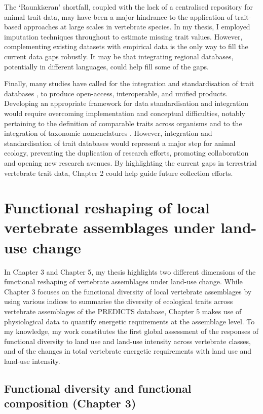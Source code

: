 The `Raunkiæran' shortfall, coupled with the lack of a centralised repository for animal trait data, may have been a major hindrance to the application of trait-based approaches at large scales in vertebrate species. In my thesis, I employed imputation techniques throughout to estimate missing trait values. However, complementing existing datasets with empirical data is the only way to fill the current data gaps robustly. It may be that integrating regional databases, potentially in different languages, could help fill some of the gaps.

Finally, many studies have called for the integration and standardisation of trait databases \citep{Kissling2018, Schneider2019, Weiss2019, Junker2022}, to produce open-access, interoperable, and unified products. Developing an appropriate framework for data standardisation and integration would require overcoming implementation and conceptual difficulties, notably pertaining to the definition of comparable traits across organisms and to the integration of taxonomic nomenclatures \citep{SalgueroGomez2021}. However, integration and standardisation of trait databases would represent a major step for animal ecology, preventing the duplication of research efforts, promoting collaboration and opening new research avenues. By highlighting the current gaps in terrestrial vertebrate trait data, Chapter 2 could help guide future collection efforts. 


\section{Functional reshaping of local vertebrate assemblages under land-use change}

In Chapter 3 and Chapter 5, my thesis highlights two different dimensions of the functional reshaping of vertebrate assemblages under land-use change. While Chapter 3 focuses on the functional diversity of local vertebrate assemblages by using various indices to summarise the diversity of ecological traits across vertebrate assemblages of the PREDICTS database, Chapter 5 makes use of physiological data to quantify energetic requirements at the assemblage level. To my knowledge, my work constitutes the first global assessment of the responses of functional diversity to land use and land-use intensity across vertebrate classes, and of the changes in total vertebrate energetic requirements with land use and land-use intensity.

\subsection{Functional diversity and functional composition (Chapter 3)}


